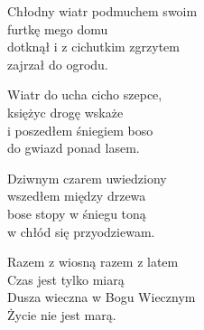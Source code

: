 \begin{text}
    Chłodny wiatr podmuchem swoim\\
    furtkę mego domu\\
    dotknął i z cichutkim zgrzytem\\
    zajrzał do ogrodu.

    Wiatr do ucha cicho szepce,\\
    księżyc drogę wskaże\\
    i poszedłem śniegiem boso\\
    do gwiazd ponad lasem.

    Dziwnym czarem uwiedziony\\
    wszedłem między drzewa\\
    bose stopy w śniegu toną\\
    w chłód się przyodziewam.

    Razem z wiosną razem z latem\\
    Czas jest tylko miarą\\
    Dusza wieczna w Bogu Wiecznym\\
    Życie nie jest marą.
\end{text}
\begin{chord}

\end{chord}